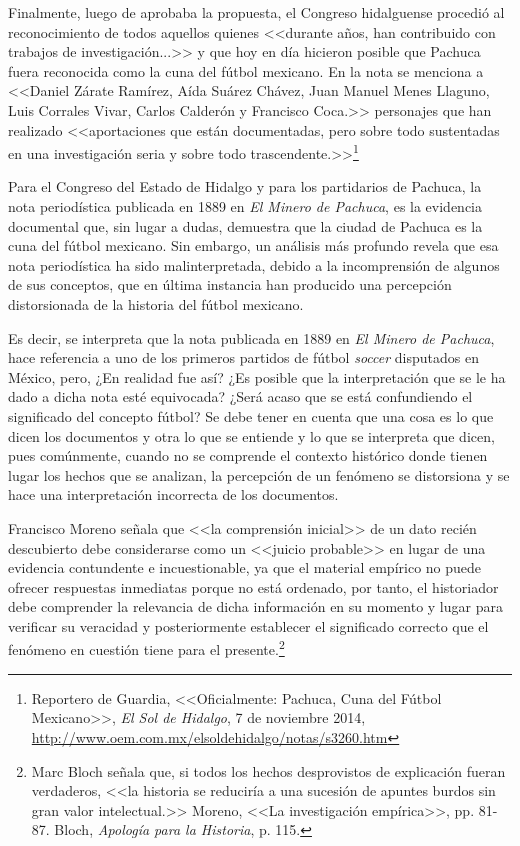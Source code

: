 \documentclass[11pt,a5paper,twoside]{book} %
\begin{document}
Finalmente, luego de aprobaba la propuesta, el Congreso hidalguense procedió al reconocimiento de todos aquellos quienes <<durante años, han contribuido con trabajos de investigación...>> y que hoy en día hicieron posible que Pachuca fuera reconocida como la cuna del fútbol mexicano. En la nota se menciona a <<Daniel Zárate Ramírez, Aída Suárez Chávez, Juan Manuel Menes Llaguno, Luis Corrales Vivar, Carlos Calderón y Francisco Coca.>> personajes que han realizado <<aportaciones que están documentadas, pero sobre todo sustentadas en una investigación seria y sobre todo trascendente.>>\footnote{Reportero de Guardia, <<Oficialmente: Pachuca, Cuna del Fútbol Mexicano>>, \emph{El Sol de Hidalgo}, 7 de noviembre 2014, \url{http://www.oem.com.mx/elsoldehidalgo/notas/s3260.htm}}

Para el Congreso del Estado de Hidalgo y para los partidarios de Pachuca, la nota periodística publicada en 1889 en \emph{El Minero de Pachuca}, es la evidencia documental que, sin lugar a dudas, demuestra que la ciudad de Pachuca es la cuna del fútbol mexicano. Sin embargo, un análisis más profundo revela que esa nota periodística ha sido malinterpretada, debido a la incomprensión de algunos de sus conceptos, que en última instancia han producido una percepción distorsionada de la historia del fútbol mexicano.

Es decir, se interpreta que la nota publicada en 1889 en \emph{El Minero de Pachuca}, hace referencia a uno de los primeros partidos de fútbol \emph{soccer} disputados en México, pero, ¿En realidad fue así? ¿Es posible que la interpretación que se le ha dado a dicha nota esté equivocada? ¿Será acaso que se está confundiendo el significado del concepto fútbol? Se debe tener en cuenta que una cosa es lo que dicen los documentos y otra lo que se entiende y lo que se interpreta que dicen, pues comúnmente, cuando no se comprende el contexto histórico donde tienen lugar los hechos que se analizan, la percepción de un fenómeno se distorsiona y se hace una interpretación incorrecta de los documentos.

Francisco Moreno señala que <<la comprensión inicial>> de un dato recién descubierto debe considerarse como un <<juicio probable>> en lugar de una evidencia contundente e incuestionable, ya que el material empírico no puede ofrecer respuestas inmediatas porque no está ordenado, por tanto, el historiador debe comprender la relevancia de dicha información en su momento y lugar para verificar su veracidad y posteriormente establecer el significado correcto que el fenómeno en cuestión tiene para el presente.\footnote{Marc Bloch señala que, si todos los hechos desprovistos de explicación fueran verdaderos, <<la historia se reduciría a una sucesión de apuntes burdos sin gran valor intelectual.>> Moreno, <<La investigación empírica>>, pp. 81-87. Bloch, \emph{Apología para la Historia}, p. 115.}
\end{document}

